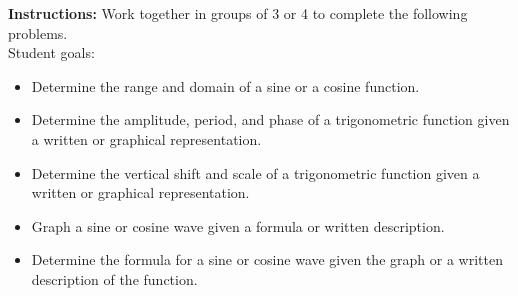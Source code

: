 


\noindent \textbf{Instructions:}  Work together in groups of  3 or 4 to complete the following problems.\\

Student goals:
\begin{itemize}
\item Determine the range and domain of a sine or a cosine function.
\item Determine the amplitude, period, and phase of a trigonometric
  function given a written or graphical representation.
\item Determine the vertical shift and scale of a trigonometric
  function given a written or graphical representation.
\item Graph a sine or cosine wave given a formula or written
  description.
\item Determine the formula for a sine or cosine wave given the
  graph or a written description of the function.
\end{itemize}

